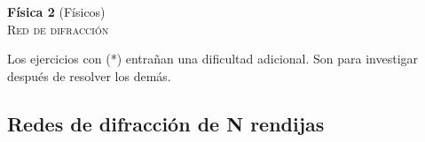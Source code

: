 \documentclass[11pt,spanish,a4paper]{article}
\begin{document}
\begin{center}
	\textbf{Física 2} (Físicos) \hfill {}\\
	\textsc{\LARGE Red de difracción}
\end{center}

Los ejercicios con (*) entrañan una dificultad adicional. Son para investigar después de resolver los demás.


\begin{enumerate}

\section*{Redes de difracción de N rendijas}








\end{enumerate}
\end{document}

